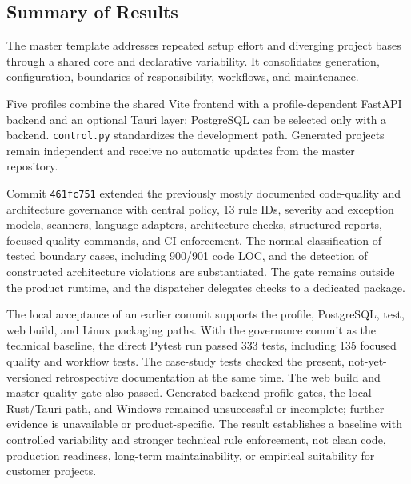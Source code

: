 \subsection{Summary of Results}
\label{subsec:zusammenfassung-ergebnisse}

The master template addresses repeated setup effort and diverging project
bases through a shared core and declarative variability. It consolidates
generation, configuration, boundaries of responsibility, workflows, and
maintenance.

Five profiles combine the shared Vite frontend with a profile-dependent
FastAPI backend and an optional Tauri layer; PostgreSQL can be selected only
with a backend. \texttt{control.py} standardizes the development path.
Generated projects remain independent and receive no automatic updates from
the master repository.

Commit \texttt{461fc751} extended the previously mostly documented code-quality
and architecture governance with central policy, 13 rule IDs, severity and
exception models, scanners, language adapters, architecture checks, structured
reports, focused quality commands, and CI enforcement. The normal
classification of tested boundary cases, including 900/901 code LOC, and the
detection of constructed architecture violations are substantiated. The gate
remains outside the product runtime, and the dispatcher delegates checks to a
dedicated package.

The local acceptance of an earlier commit supports the profile, PostgreSQL,
test, web build, and Linux packaging paths. With the governance commit as the
technical baseline, the direct Pytest run passed 333 tests, including 135
focused quality and workflow tests. The case-study tests checked the present,
not-yet-versioned retrospective documentation at the same time. The web build
and master quality gate also passed. Generated backend-profile gates, the
local Rust/Tauri path, and Windows remained unsuccessful or incomplete;
further evidence is unavailable or product-specific. The result establishes a
baseline with controlled variability and stronger technical rule enforcement,
not clean code, production readiness, long-term maintainability, or empirical
suitability for customer projects.
